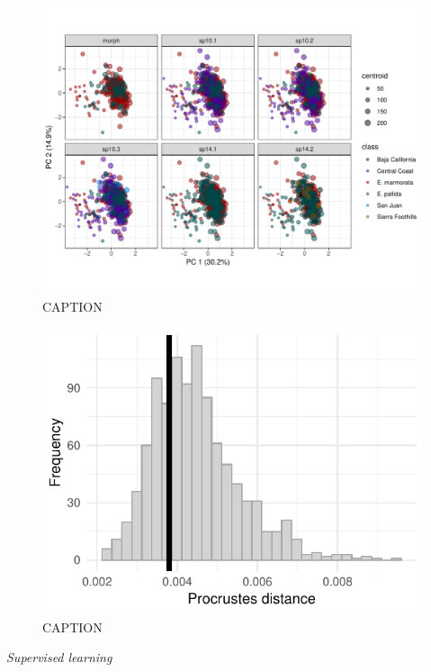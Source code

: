 \documentclass[12pt,letterpaper]{article}
\renewcommand{\subsection}[1]{%
\bigskip
\begin{center}
\begin{large}
\normalfont\itshape #1
\end{large}
\end{center}}
\begin{document}
\begin{figure}[ht]
  \centering
  \includegraphics[height = \textheight, width = \textwidth, keepaspectratio = true]{figure/emys_pc_graph}
  \caption{CAPTION}
  \label{fig:emys_pca}
\end{figure}


\begin{figure}[ht]
  \centering
  \includegraphics[height = \textheight, width = \textwidth, keepaspectratio = true]{figure/sex_test_hist}
  \caption{CAPTION}
  \label{fig:sex_test}
\end{figure}



\subsection{Supervised learning}
\end{document}

